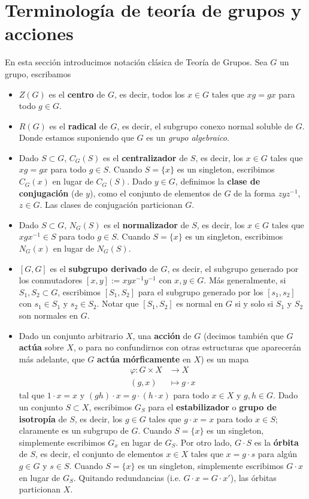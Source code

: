 \documentclass[spanish,10pt]{amsart}
\theoremstyle{definition}
\theoremstyle{remark}
\numberwithin{equation}{section}
\begin{document}
\section{Terminología de teoría de grupos y acciones}
En esta sección introducimos notación clásica de Teoría de Grupos. Sea $G$ un grupo, escribamos
\begin{itemize}
\item $Z(G)$ es el \textbf{centro} de $G$, es decir, todos los $x \in G$ tales que $x g = g x$ para todo $g \in G$.
\item $R(G)$ es el \textbf{radical} de $G$, es decir, el subgrupo conexo normal soluble de $G$. Donde estamos suponiendo que $G$ es un \textit{grupo algebraico}.
\item Dado $S \subset G$, $C_G (S)$ es el \textbf{centralizador} de $S$, es decir, los $x \in G$ tales que $x g = g x$ para todo $g \in S$. Cuando $S = \{x\}$ es un singleton, escribimos $C_G (x)$ en lugar de $C_G (S)$. Dado $y \in G$, definimos la \textbf{clase de conjugación} (de $y$), como el conjunto de elementos de $G$ de la forma $z y z^{-1}$, $z \in G$. Las clases de conjugación particionan $G$.
\item Dado $S \subset G$, $N_G (S)$ es el \textbf{normalizador} de $S$, es decir, los $x \in G$ tales que $x g x^{-1} \in S$ para todo $g \in S$. Cuando $S = \{x\}$ es un singleton, escribimos $N_G (x)$ en lugar de $N_G (S)$.
\item $[G,G]$ es el \textbf{subgrupo derivado} de $G$, es decir, el subgrupo generado por los conmutadores $[x,y] := x y x^{-1}y^{-1}$ con $x,y \in G$. Más generalmente, si $S_1, S_2 \subset G$, escribimos $[S_1, S_2]$ para el subgrupo generado por los $[s_1,s_2]$ con $s_1 \in S_1 $ y $s_2 \in S_2$. Notar que $[S_1,S_2]$ es normal en $G$ si y solo si $S_1$ y $S_2$ son normales en $G$.
\item Dado un conjunto arbitrario $X$, una \textbf{acción} de $G$ (decimos también que $G$ \textbf{actúa} sobre $X$, o para no confundirnos con otras estructuras que aparecerán más adelante, que $G$ \textbf{actúa mórficamente} en $X$) es un mapa
\begin{align*}
\varphi : G \times X &\longrightarrow X \\
(g,x) &\longmapsto g \cdot x
\end{align*}
tal que $1 \cdot x = x$ y $(gh) \cdot x = g \cdot (h \cdot x)$ para todo $x \in X$ y $g,h \in G$. Dado un conjunto $S \subset X$, escribimos $G_S$ para el \textbf{estabilizador} o \textbf{grupo de isotropía} de $S$, es decir, los $g \in G$ tales que $g \cdot x = x$ para todo $x \in S$; claramente es un subgrupo de $G$. Cuando $S = \{x\}$ es un singleton, simplemente escribimos $G_x$ en lugar de $G_S$. Por otro lado, $G \cdot S$ es la \textbf{órbita} de $S$, es decir, el conjunto de elementos $x \in X$ tales que $x = g \cdot s$ para algún $g \in G$ y $s \in S$. Cuando $S = \{x\}$ es un singleton, simplemente escribimos $G \cdot x$ en lugar de $G_S$. Quitando redundancias (i.e. $G \cdot x = G \cdot x'$), las órbitas particionan $X$.

\end{itemize}
\end{document}
